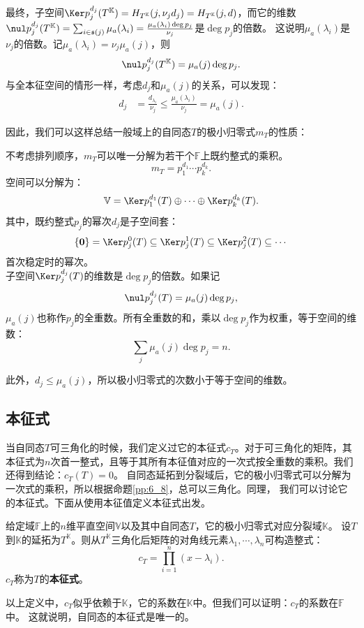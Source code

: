 \documentclass[12pt,UTF8]{ctexbook}
\begin{document}
最终，子空间$\Ker p_j^{d_j}(T^{\mathbb{K}}) = H_{T^{\mathbb{K}}}(j, \nu_j d_j) = H_{T^{\mathbb{K}}}(j, d)$，而它的维数
$\nul p_j^{d_j}(T^{\mathbb{K}}) = \sum_{i\in \mathfrak{s}(j)} \mu_a(\lambda_i) = \frac{\mu_a(\lambda_i) \deg p_j}{\nu_j} $是$\deg p_j$的倍数。
这说明$\mu_a(\lambda_i)$是$\nu_j$的倍数。记$\mu_a(\lambda_i) = \nu_j \mu_a(j)$，则
$$ \nul p_j^{d_j}(T^{\mathbb{K}}) = \mu_a(j) \deg p_j. $$
与全本征空间的情形一样，考虑$d_j$和$\mu_a(j)$的关系，可以发现：
\begin{align*}
    d_j &= \frac{d_{\lambda_i}}{\nu_j} \leqslant \frac{\mu_a(\lambda_i)}{\nu_j} = \mu_a(j).  
\end{align*}

因此，我们可以这样总结一般域上的自同态$T$的极小归零式$m_T$的性质：
\begin{pp}\label{pp:9_7_1}
不考虑排列顺序，$m_T$可以唯一分解为若干个$\mathbb{F}$上既约整式的乘积。
$$ m_T = p_1^{d_1}\cdots p_k^{d_k}.$$
空间可以分解为：
$$ \mathbb{V} = \Ker p_1^{d_1}(T) \oplus \cdots \oplus \Ker p_k^{d_k}(T). $$
其中，既约整式$p_j$的幂次$d_j$是子空间套：
$$ \{\mathbf{0}\} = \Ker p_j^{0}(T) \subseteq \Ker p_j^{1}(T) \subseteq \Ker p_j^{2}(T) \subseteq \cdots $$
首次稳定时的幂次。\\
子空间$\Ker p_j^{d_j}(T)$的维数是$\deg p_j$的倍数。如果记
$$ \nul p_j^{d_j}(T) = \mu_a(j) \deg p_j, $$
$\mu_a(j)$也称作$p_j$的全重数。所有全重数的和，乘以$\deg p_j$作为权重，等于空间的维数：
$$ \sum_j \mu_a(j) \deg p_j = n . $$
\end{pp}

此外，$d_j  \leqslant \mu_a(j) $，所以极小归零式的次数小于等于空间的维数。

\subsection{本征式}
当自同态$T$可三角化的时候，我们定义过它的本征式$c_T$。对于可三角化的矩阵，其本征式为$n$次首一整式，且等于其所有本征值对应的一次式按全重数的乘积。我们还得到结论：$c_T(T) = 0$。
自同态延拓到分裂域后，它的极小归零式可以分解为一次式的乘积，所以根据命题\ref{pp:6_8}，总可以三角化。同理，
我们可以讨论它的本征式。下面从使用本征值定义本征式出发。

\begin{df}\label{df:9_5}
    给定域$\mathbb{F}$上的$n$维平直空间$\mathbb{V}$以及其中自同态$T$，它的极小归零式对应分裂域$\mathbb{K}$。
    设$T$到$\mathbb{K}$的延拓为$T^{\mathbb{K}}$。则从$T^{\mathbb{K}}$三角化后矩阵的对角线元素$\lambda_1, \cdots , \lambda_n$可构造整式：
    $$ c_T = \prod_{i=1}^n (x - \lambda_i).$$
    $c_T$称为$T$的\textbf{本征式}。
\end{df}
以上定义中，$c_T$似乎依赖于$\mathbb{K}$，它的系数在$\mathbb{K}$中。但我们可以证明：$c_T$的系数在$\mathbb{F}$中。
这就说明，自同态的本征式是唯一的。
\end{document}
